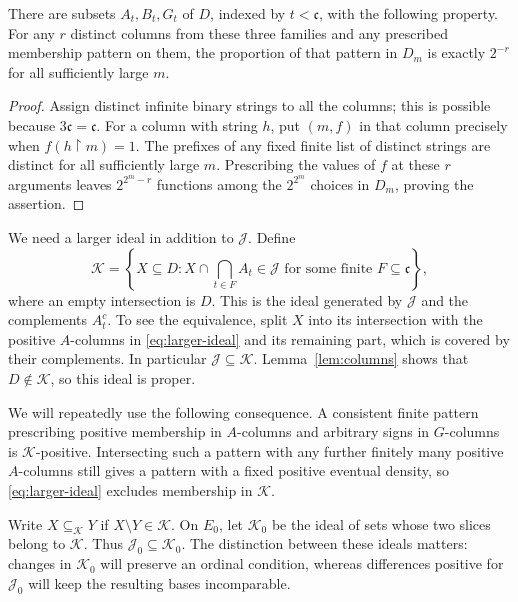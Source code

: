 \begin{lemma}\label{lem:columns}
There are subsets $A_t,B_t,G_t$ of $D$, indexed by $t<\mathfrak c$,
with the following property. For any $r$ distinct columns from these
three families and any prescribed membership pattern on them, the
proportion of that pattern in $D_m$ is exactly $2^{-r}$ for all
sufficiently large $m$.
\end{lemma}

\begin{proof}
Assign distinct infinite binary strings to all the columns; this is
possible because $3\mathfrak c=\mathfrak c$. For a column with string
$h$, put $(m,f)$ in that column precisely when
$f(h\upharpoonright m)=1$.
The prefixes of any fixed finite list of distinct strings are distinct
for all sufficiently large $m$. Prescribing the values of $f$ at these
$r$ arguments leaves $2^{2^m-r}$ functions among the $2^{2^m}$ choices
in $D_m$, proving the assertion.
\end{proof}

We need a larger ideal in addition to $\mathcal J$. Define
\begin{equation}\label{eq:larger-ideal}
 \mathcal K=\left\{X\subseteq D:
 X\cap\bigcap_{t\in F}A_t\in\mathcal J
 \text{ for some finite }F\subseteq\mathfrak c\right\},
\end{equation}
where an empty intersection is $D$. This is the ideal generated by
$\mathcal J$ and the complements $A_t^c$. To see the equivalence, split
$X$ into its intersection with the positive $A$-columns in
\eqref{eq:larger-ideal} and its remaining part, which is covered by
their complements. In particular $\mathcal J\subseteq\mathcal K$.
Lemma~\ref{lem:columns} shows that $D\notin\mathcal K$, so this ideal
is proper.

We will repeatedly use the following consequence. A consistent finite
pattern prescribing positive membership in $A$-columns and arbitrary
signs in $G$-columns is $\mathcal K$-positive. Intersecting such a pattern
with any further finitely many positive $A$-columns still gives a
pattern with a fixed positive eventual density, so
\eqref{eq:larger-ideal} excludes membership in $\mathcal K$.

Write $X\subseteq_{\mathcal K}Y$ if $X\setminus Y\in\mathcal K$.
On $E_0$, let $\mathcal K_0$ be the ideal of sets whose two slices
belong to $\mathcal K$. Thus $\mathcal J_0\subseteq\mathcal K_0$.
The distinction between these ideals matters: changes in
$\mathcal K_0$ will preserve an ordinal condition, whereas differences
positive for $\mathcal J_0$ will keep the resulting bases incomparable.

